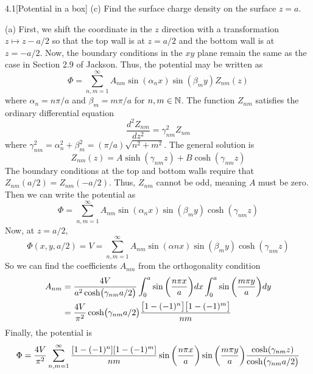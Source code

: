 \documentclass[12pt]{article}
\begin{document}
\begin{problem}{4.1}[Potential in a box]
(c) Find the surface charge density on the surface $z=a$.
\begin{solution}
(a) First, we shift the coordinate in the $z$ direction with a transformation
$z\mapsto z-a /2$ so that the top wall is at $z=a /2$ and the bottom wall is at
$z=-a /2$. Now, the boundary conditions in the $xy$ plane remain the same as
the case in Section 2.9 of Jackson. Thus, the potential may be written as
\begin{equation}
    \Phi=\sum_{n,m=1}^\infty A_{nm}\sin(\alpha_nx)\sin(\beta_my)Z_{nm}(z) 
\end{equation}
where $\alpha_n=n\pi /a$ and $\beta_m=m\pi /a$ for $n,m\in\mathbb{N}$. The function
$Z_{nm}$ satisfies the ordinary differential equation
\begin{equation}
    \frac{d^2Z_{nm}}{dz^2}=\gamma_{nm}^2Z_{nm} 
\end{equation}
where $\gamma_{nm}^2=\alpha_n^2+\beta_m^2=(\pi /a)\sqrt{n^2+m^2}$. The general
solution is
\begin{equation}
    Z_{nm}(z)=A\sinh(\gamma_{nm}z)+B\cosh(\gamma_{nm}z) 
\end{equation}
The boundary conditions at the top and bottom walls require that
$Z_{nm}(a /2)=Z_{nm}(-a /2)$. Thus, $Z_{nm}$ cannot be odd, meaning $A$ must be
zero. Then we can write the potential as
\begin{equation}
    \Phi=\sum_{n,m=1}^\infty
    A_{nm}\sin(\alpha_nx)\sin(\beta_my)\cosh(\gamma_{nm}z) 
\end{equation}
Now, at $z=a /2$,
\begin{equation}
    \Phi(x,y,a / 2)=V=\sum_{n,m=1}^\infty A_{nm}\sin(\alpha
    nx)\sin(\beta_my)\cosh(\gamma_{nm}z) 
\end{equation}
So we can find the coefficients $A_{nm}$ from the orthogonality condition
\begin{align}
    A_{nm}
    &=\frac{4V}{a^2\cosh(\gamma_{nm}a / 2)}\int_0^a\sin\qty(\frac{n\pi
    x}{a})dx\int_0^a\sin\qty(\frac{m\pi y}{a})dy \notag\\
    &=\frac{4V}{\pi^2}\cosh(\gamma_{nm}a /
    2)\frac{\qty[1-(-1)^n]\qty[1-(-1)^m]}{nm}
\end{align}
Finally, the potential is
\begin{equation}
    \Phi=\frac{4V}{\pi^2}\sum_{n,m=1}^\infty
        \frac{[1-(-1)^n][1-(-1)^m]}{nm}\sin\qty(\frac{n\pi
        x}{a})\sin\qty(\frac{m\pi
    y}{a})\frac{\cosh(\gamma_{nm}z)}{\cosh(\gamma_{nm}a /2)}
\end{equation}


\end{solution}
\end{problem}
\end{document}
